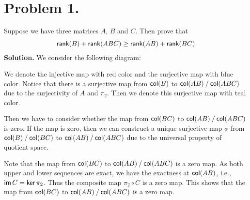\section*{Problem 1.}
Suppose we have three matrices $A$, $B$ and $C$. Then prove that
\[
  \rank(B) + \rank(ABC) \geq \rank(AB) + \rank(BC)
\]
\textbf{Solution.} We consider the following diagram:
\begin{center}
\end{center}

We denote the injective map with red color and the surjective map with blue color. Notice that there is a surjective map from $\col(B)$ to $\quotient{\col(AB)}{\col(ABC)}$ due to the surjectivity of $A$ and $\pi_2$. Then we denote this surjective map with teal color.

Then we have to consider whether the map from $\col(BC)$ to $\quotient{\col(AB)}{\col(ABC)}$ is zero. If the map is zero, then we can construct a unique surjective map $\phi$ from $\quotient{\col(B)}{\col(BC)}$ to $\quotient{\col(AB)}{\col(ABC)}$ due to the universal property of quotient space.

Note that the map from $\col(BC)$ to $\quotient{\col(AB)}{\col(ABC)}$ is a zero map. As both upper and lower sequences are exact, we have the exactness at $\col(AB)$, i.e., $\im{C} = \ker{\pi_2}$. Thus the composite map $\pi_2 \circ C$ is a zero map. This shows that the map from $\col(BC)$ to $\quotient{\col(AB)}{\col(ABC)}$ is a zero map.

